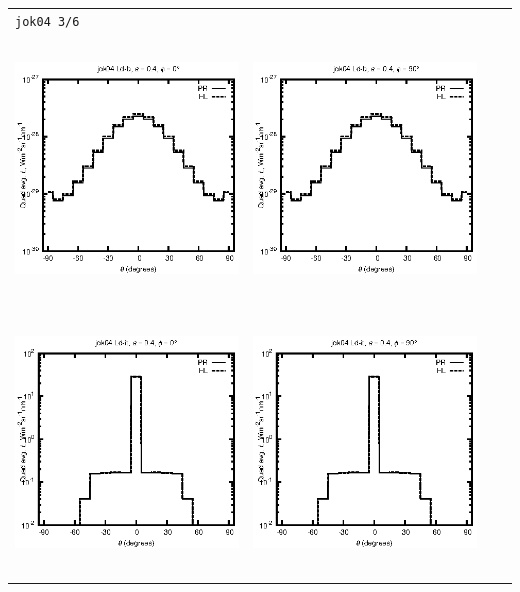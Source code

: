 \begin{tabular}{c c c c}
\multicolumn{4}{l}{\texttt{jok04 3/6}} \\
\includegraphics[height=7cm]{../eps/jok04_Ld_b_fwd.eps} &
\includegraphics[height=7cm]{../eps/jok04_Ld_b_cross.eps} \\
\includegraphics[height=7cm]{../eps/jok04_Ld_it_fwd.eps} &
\includegraphics[height=7cm]{../eps/jok04_Ld_it_cross.eps} \\

\end{tabular}
